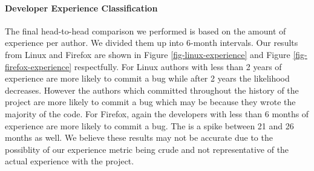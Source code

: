 


\paragraph{Developer Experience Classification}
The final head-to-head comparison we performed is based on the amount
of experience per author. We divided them up into 6-month intervals. 
Our results from Linux and Firefox are shown in Figure
\ref{fig-linux-experience} and Figure \ref{fig-firefox-experience}
respectfully. For Linux authors with less than 2 years of experience
are more likely to commit a bug while after 2 years the likelihood
decreases. However the authors which committed throughout the history
of the project are more likely to commit a bug which may be because
they wrote the majority of the code. For Firefox, again the
developers with less than 6 months of experience are more likely to
commit a bug. The is a spike between 21 and 26 months as well. We
believe these results may not be accurate due to the possiblity of
our experience metric being crude and not representative of the 
actual experience with the project.



